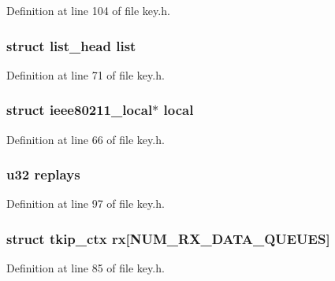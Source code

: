 Definition at line 104 of file key.\-h.

\hypertarget{structieee80211__key_a1f00f18b91d5a820f2c43064243aa86e}{
\subsubsection[{list}]{\setlength{\rightskip}{0pt plus 5cm}struct list\-\_\-head list}}\label{structieee80211__key_a1f00f18b91d5a820f2c43064243aa86e}


Definition at line 71 of file key.\-h.

\hypertarget{structieee80211__key_ad436a024f420f219c4fe2eebce7e4ab2}{
\subsubsection[{local}]{\setlength{\rightskip}{0pt plus 5cm}struct {\bf ieee80211\-\_\-local}$\ast$ local}}\label{structieee80211__key_ad436a024f420f219c4fe2eebce7e4ab2}


Definition at line 66 of file key.\-h.

\hypertarget{structieee80211__key_a0c08b132b796ebfdeda0499ae965b637}{
\subsubsection[{replays}]{\setlength{\rightskip}{0pt plus 5cm}u32 replays}}\label{structieee80211__key_a0c08b132b796ebfdeda0499ae965b637}


Definition at line 97 of file key.\-h.

\hypertarget{structieee80211__key_a47e91edc6699fec0d3ddca2c17c58a16}{
\subsubsection[{rx}]{\setlength{\rightskip}{0pt plus 5cm}struct {\bf tkip\-\_\-ctx} rx\mbox{[}{\bf N\-U\-M\-\_\-\-R\-X\-\_\-\-D\-A\-T\-A\-\_\-\-Q\-U\-E\-U\-E\-S}\mbox{]}}}\label{structieee80211__key_a47e91edc6699fec0d3ddca2c17c58a16}


Definition at line 85 of file key.\-h.

